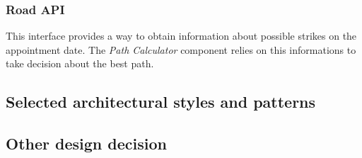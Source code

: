 \subsubsection{Road API}
This interface provides a way to obtain information about possible strikes on the appointment date.
The \emph{Path Calculator} component relies on this informations to take decision about the best path.

\clearpage
\subsection{Selected architectural styles and patterns}

\clearpage
\subsection{Other design decision}